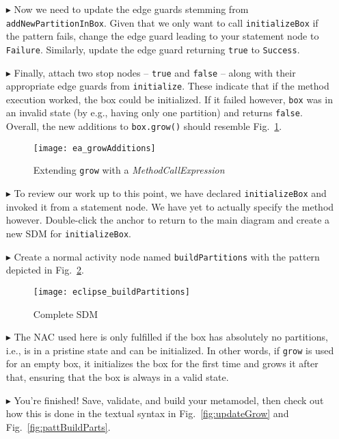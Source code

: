 \begin{itemize}
\clearpage

\item[$\blacktriangleright$] Now we need to update the edge guards stemming from \texttt{add\-New\-Part\-ition\-In\-Box}. Given that we only want to call
\texttt{initializeBox} if the pattern fails, change the edge guard leading to your statement node to \texttt{Failure}. Similarly, update the edge guard
returning \texttt{true} to \texttt{Success}.

\item[$\blacktriangleright$] Finally, attach two stop nodes -- \texttt{true} and \texttt{false} -- along with their appropriate edge guards from
\texttt{initialize}. These indicate that if the method execution worked, the box could be initialized. If it failed however, \texttt{box} was
in an invalid state (by e.g., having only one partition) and returns \texttt{false}. Overall, the new additions to \texttt{box.grow()} should resemble
Fig.~\ref{fig:newGrowControl}.

\vspace{0.5cm}

\begin{figure}[htp]
\begin{center}
  \texttt{[image: ea\_growAdditions]}
  \caption{Extending \texttt{grow} with a \emph{MethodCallExpression}}
  \label{fig:newGrowControl}
\end{center}
\end{figure}

\item[$\blacktriangleright$] To review our work up to this point, we have declared \texttt{initializeBox} and invoked it from a statement node. We have yet
to actually specify the method however. Double-click the anchor to return to the main diagram and create a new SDM
for \texttt{initializeBox}.

\item[$\blacktriangleright$] Create a normal activity node named \texttt{buildPartitions} with the pattern depicted in Fig.~\ref{fig:buildPartitions}.

\newpage
 
\begin{figure}[htp]
\begin{center}
  \texttt{[image: eclipse\_buildPartitions]}
  \caption{Complete SDM}
  \label{fig:buildPartitions}
\end{center}
\end{figure}
 
\item[$\blacktriangleright$] The NAC used here is only fulfilled if the box has absolutely no partitions, i.e., is in a pristine state and can be
initialized. In other words, if \texttt{grow} is used for an empty box, it initializes the box for the first time and grows it after that, ensuring that the box
is always in a valid state.
 
\item[$\blacktriangleright$] You're finished! Save, validate, and build your metamodel, then check out how this is done in the textual syntax in
Fig.~\ref{fig:updateGrow} and Fig.~\ref{fig:pattBuildParts}.


\end{itemize}

